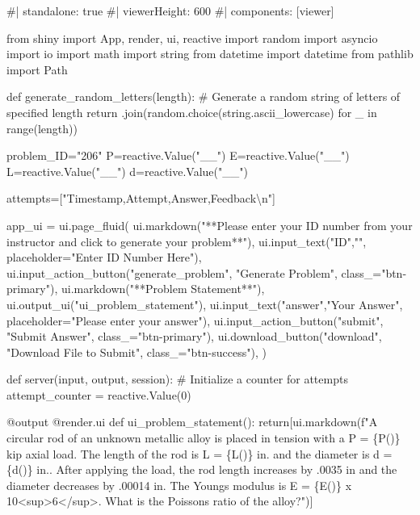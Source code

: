 \documentclass[
  letterpaper,
  DIV=11,
  numbers=noendperiod]{scrreprt}
\newenvironment{Shaded}{\begin{snugshade}}{\end{snugshade}}
\newcommand{\NormalTok}[1]{\textcolor[rgb]{0.00,0.23,0.31}{#1}}
\begin{document}
\begin{Shaded}
\begin{Highlighting}[]
\NormalTok{\#| standalone: true}
\NormalTok{\#| viewerHeight: 600}
\NormalTok{\#| components: [viewer]}

\NormalTok{from shiny import App, render, ui, reactive}
\NormalTok{import random}
\NormalTok{import asyncio}
\NormalTok{import io}
\NormalTok{import math}
\NormalTok{import string}
\NormalTok{from datetime import datetime}
\NormalTok{from pathlib import Path}

\NormalTok{def generate\_random\_letters(length):}
\NormalTok{    \# Generate a random string of letters of specified length}
\NormalTok{    return \textquotesingle{}\textquotesingle{}.join(random.choice(string.ascii\_lowercase) for \_ in range(length)) }

\NormalTok{problem\_ID="206"}
\NormalTok{P=reactive.Value("\_\_")}
\NormalTok{E=reactive.Value("\_\_")}
\NormalTok{L=reactive.Value("\_\_")}
\NormalTok{d=reactive.Value("\_\_")}



\NormalTok{attempts=["Timestamp,Attempt,Answer,Feedback\textbackslash{}n"]}

\NormalTok{app\_ui = ui.page\_fluid(}
\NormalTok{    ui.markdown("**Please enter your ID number from your instructor and click to generate your problem**"),}
\NormalTok{    ui.input\_text("ID","", placeholder="Enter ID Number Here"),}
\NormalTok{    ui.input\_action\_button("generate\_problem", "Generate Problem", class\_="btn{-}primary"),}
\NormalTok{    ui.markdown("**Problem Statement**"),}
\NormalTok{    ui.output\_ui("ui\_problem\_statement"),}
\NormalTok{    ui.input\_text("answer","Your Answer", placeholder="Please enter your answer"),}
\NormalTok{    ui.input\_action\_button("submit", "Submit Answer", class\_="btn{-}primary"),}
\NormalTok{    ui.download\_button("download", "Download File to Submit", class\_="btn{-}success"),}
\NormalTok{)}


\NormalTok{def server(input, output, session):}
\NormalTok{    \# Initialize a counter for attempts}
\NormalTok{    attempt\_counter = reactive.Value(0)}

\NormalTok{    @output}
\NormalTok{    @render.ui}
\NormalTok{    def ui\_problem\_statement():}
\NormalTok{        return[ui.markdown(f"A circular rod of an unknown metallic alloy is placed in tension with a P = \{P()\} kip axial load. The length of the rod is L = \{L()\} in. and the diameter is d = \{d()\} in.. After applying the load, the rod length increases by .0035 in and the diameter decreases by .00014 in. The Young\textquotesingle{}s modulus is E = \{E()\} x 10\textless{}sup\textgreater{}6\textless{}/sup\textgreater{}. What is the Poisson\textquotesingle{}s ratio of the alloy?")]}
    

\end{Highlighting}
\end{Shaded}
\end{document}
